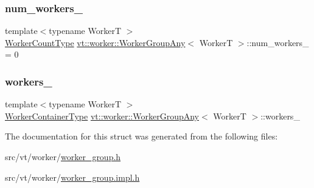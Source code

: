 \mbox{\label{structvt_1_1worker_1_1_worker_group_any_a84a8e36ce6d70e66b712ce04f224fd64}} 
\subsubsection{\texorpdfstring{num\+\_\+workers\+\_\+}{num\_workers\_}}
{\footnotesize\ttfamily template$<$typename WorkerT $>$ \\
\hyperlink{namespacevt_aa93398ea48f2cb6c188512250f7cc248}{Worker\+Count\+Type} \hyperlink{structvt_1_1worker_1_1_worker_group_any}{vt\+::worker\+::\+Worker\+Group\+Any}$<$ WorkerT $>$\+::num\+\_\+workers\+\_\+ = 0\hspace{0.3cm}{\ttfamily [private]}}

\mbox{\label{structvt_1_1worker_1_1_worker_group_any_a370802bca31db13895b73f19d699ea3b}} 
\subsubsection{\texorpdfstring{workers\+\_\+}{workers\_}}
{\footnotesize\ttfamily template$<$typename WorkerT $>$ \\
\hyperlink{structvt_1_1worker_1_1_worker_group_any_ad7e74c099f11c75bc35c838baedaa2cd}{Worker\+Container\+Type} \hyperlink{structvt_1_1worker_1_1_worker_group_any}{vt\+::worker\+::\+Worker\+Group\+Any}$<$ WorkerT $>$\+::workers\+\_\+\hspace{0.3cm}{\ttfamily [private]}}



The documentation for this struct was generated from the following files\+:\begin{DoxyCompactItemize}
\item 
src/vt/worker/\hyperlink{worker__group_8h}{worker\+\_\+group.\+h}\item 
src/vt/worker/\hyperlink{worker__group_8impl_8h}{worker\+\_\+group.\+impl.\+h}\end{DoxyCompactItemize}
